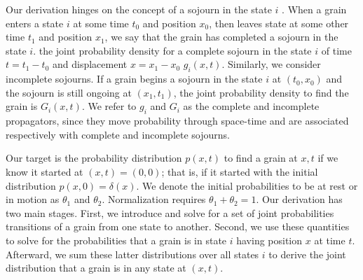 \documentclass[draft,grl]{agujournal2018}
\begin{document}
Our derivation hinges on the concept of a sojourn in the state $i$ \citep{Weiss1994}.
When a grain enters a state $i$ at some time $t_0$ and position $x_0$, then leaves  state at some other time $t_1$ and position $x_1$, we say that the grain has completed a sojourn in the state $i$. the joint probability density for a complete sojourn in the state $i$ of time $t = t_1-t_0$ and displacement $x = x_1-x_0$  $g_i(x,t).$ 
Similarly, we consider incomplete sojourns. If a grain begins a sojourn in the state $i$ at $(t_0,x_0)$ and the sojourn is still ongoing at $(x_1,t_1)$, the joint probability density to find the grain is $G_i(x,t)$.
We refer to $g_i$ and $G_i$ as the complete and incomplete propagators, since they move probability through space-time and are associated respectively with complete and incomplete sojourns.

Our target is the probability distribution $p(x,t)$ to find a grain at $x,t$ if we know it started at $(x,t)=(0,0)$; that is, if it started with the initial distribution $p(x,0)=\delta(x)$.
We denote the initial probabilities to be at rest or in motion as $\theta_1$ and $\theta_2$. Normalization requires $\theta_1+\theta_2=1$.
Our derivation has two main stages.
First, we introduce and solve for a set of joint probabilities  transitions of a grain from one state to another.
Second, we use these quantities to solve for the probabilities that a grain is in state $i$ having position $x$ at time $t$.
Afterward, we sum these latter distributions over all states $i$ to derive the joint distribution that a grain is in any state at $(x,t)$.
\end{document}
